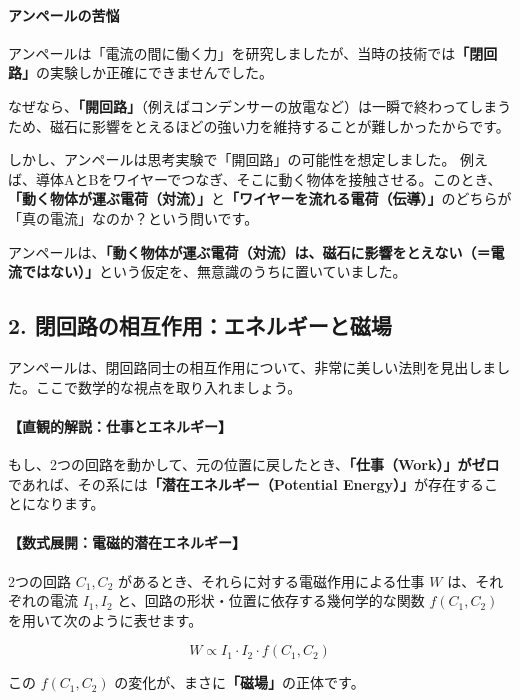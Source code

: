 \documentclass[a4paper,11pt,openany]{ltjsbook}
\begin{document}
\begin{lecturebox}
\paragraph{アンペールの苦悩}
アンペールは「電流の間に働く力」を研究しましたが、当時の技術では\textbf{「閉回路」}の実験しか正確にできませんでした。

なぜなら、\textbf{「開回路」}（例えばコンデンサーの放電など）は一瞬で終わってしまうため、磁石に影響をとえるほどの強い力を維持することが難しかったからです。

しかし、アンペールは思考実験で「開回路」の可能性を想定しました。
例えば、導体AとBをワイヤーでつなぎ、そこに動く物体を接触させる。このとき、\textbf{「動く物体が運ぶ電荷（対流）」}と\textbf{「ワイヤーを流れる電荷（伝導）」}のどちらが「真の電流」なのか？という問いです。

アンペールは、\textbf{「動く物体が運ぶ電荷（対流）は、磁石に影響をとえない（＝電流ではない）」}という仮定を、無意識のうちに置いていました。

\subsection*{2. 閉回路の相互作用：エネルギーと磁場}

アンペールは、閉回路同士の相互作用について、非常に美しい法則を見出しました。ここで数学的な視点を取り入れましょう。

\paragraph{【直観的解説：仕事とエネルギー】}
もし、2つの回路を動かして、元の位置に戻したとき、\textbf{「仕事（Work）」がゼロ}であれば、その系には\textbf{「潜在エネルギー（Potential Energy）」}が存在することになります。

\paragraph{【数式展開：電磁的潜在エネルギー】}
2つの回路 $C_1, C_2$ があるとき、それらに対する電磁作用による仕事 $W$ は、それぞれの電流 $I_1, I_2$ と、回路の形状・位置に依存する幾何学的な関数 $f(C_1, C_2)$ を用いて次のように表せます。

$$W \propto I_1 \cdot I_2 \cdot f(C_1, C_2)$$

この $f(C_1, C_2)$ の変化が、まさに\textbf{「磁場」}の正体です。


\end{lecturebox}
\end{document}
